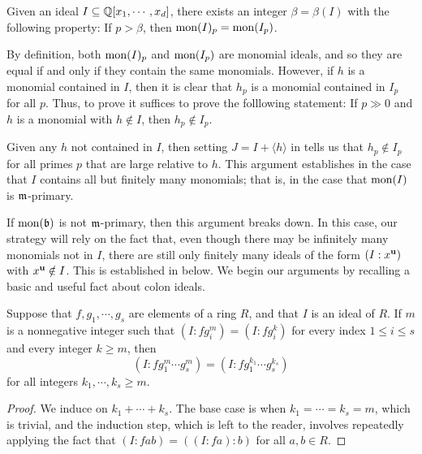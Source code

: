 \documentclass[11pt]{amsart}
\begin{document}
\begin{theorem}
\label{mon-operation-modulo-p: T}
Given an ideal $I \subseteq \mathbb{Q}[x_1, \cdots, x_d]$, there exists an integer $\beta = \beta(I)$ with the following property:  If $p > \beta$, then $\operatorname{mon}(I)_p = \operatorname{mon}(I_p)$.
\end{theorem}

By definition, both $\operatorname{mon}(I)_p$ and $\operatorname{mon}(I_p)$ are monomial ideals, and so they are equal if and only if they contain the same monomials.  However, if $h$ is a monomial contained in $I$, then it is clear that $h_p$ is a monomial contained in $I_p$ for all $p$.  Thus, to prove  it suffices to prove the folllowing statement:  If $p \gg 0$ and $h$ is a monomial with $h \notin I$, then $h_p \notin I_p$.

Given any $h$ not contained in $I$, then setting $J = I + \langle h \rangle$ in  tells us that $h_p \notin I_p$ for all primes $p$ that are large relative to $h$.  This argument establishes  in the case that $I$ contains all but finitely many monomials;  that is, in the case that $ \operatorname{mon}(I)$ is $\mathfrak{m}$-primary.

If $\operatorname{mon}(\mathfrak{b})$ is not $\mathfrak{m}$-primary, then this argument breaks down.  In this case, our strategy will rely on the fact that, even though there may be infinitely many monomials not in $I$, there are still only finitely many ideals of the form $(I:x^{\mathbf{u}})$ with $x^{\mathbf{u}} \notin I$.    This is established in  below.  We begin our arguments by recalling a basic and useful fact about colon ideals.




\begin{lemma}
\label{colon-product-stabilization: L}
  Suppose that $f,g_1, \cdots, g_s$ are elements of a ring $R$, and that $I$ is an ideal of $R$.
If $m$ is a nonnegative integer such that $(I: f g_i^m) = (I: f g_i^k)$ for every index $1 \leq i \leq s$ and every integer $k \geq m$, then \[ (I: f g_1^m \cdots g_s^m) = (I: f g_1^{k_1} \cdots g_s^{k_s})\] for all integers $k_1, \cdots, k_s \geq m$.
\end{lemma}

\begin{proof}
We induce on $k_1 + \cdots + k_s$.  The base case is when $k_1 = \cdots = k_s = m$, which is trivial, and the induction step, which is left to the reader, involves repeatedly applying the fact that $(I:fab) = ((I:fa):b)$ for all $a,b \in R$.
\end{proof}
\end{document}
